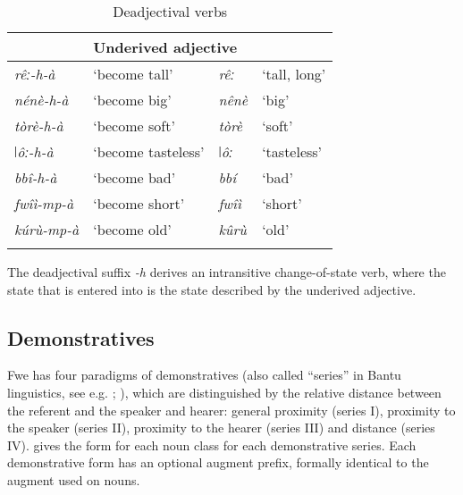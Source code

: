 \begin{table}
\label{bkm:Ref491097959}\caption{\label{tab:4:18}Deadjectival verbs}
\begin{tabular}{llll}
\lsptoprule
\multicolumn{2}{l}{Derived verb} & \multicolumn{2}{l}{Underived adjective}\\
\midrule
{\itshape rêː-h-à} & ‘become tall’ & {\itshape rêː} & ‘tall, long’\\
{\itshape nénè-h-à} & ‘become big’ & {\itshape nênè} & ‘big’\\
{\itshape tòrè-h-à} & ‘become soft’ & {\itshape tòrè} & ‘soft’\\
{\itshape ǀôː-h-à} & ‘become tasteless’ & {\itshape ǀôː} & ‘tasteless’\\
{\itshape bbî-h-à} & ‘become bad’ & {\itshape bbí} & ‘bad’\\
{\itshape fwîì-mp-à} & ‘become short’ & {\itshape fwîì} & ‘short’\\
{\itshape kúrù-mp-à} & ‘become old’ & {\itshape kûrù} & ‘old’\\
\lspbottomrule
\end{tabular}
\end{table}

The deadjectival suffix \textit{-h} derives an intransitive change-of-state verb, where the state that is entered into is the state described by the underived adjective.

\subsection{Demonstratives}
\label{bkm:Ref492026896}\hypertarget{Toc75352647}{}\label{bkm:Ref450747952}
Fwe has four paradigms of demonstratives (also called “series” in Bantu linguistics, see e.g. \citet{Nicolle2012}; \citet{Wal2010}), which are distinguished by the relative distance between the referent and the speaker and hearer: general proximity (series I), proximity to the speaker (series II), proximity to the hearer (series III) and distance (series IV).  gives the form for each noun class for each demonstrative series. Each demonstrative form has an optional augment prefix, formally identical to the augment used on nouns.

